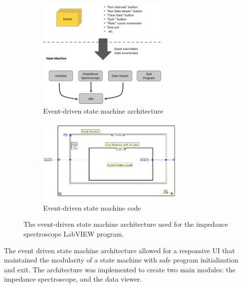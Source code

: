 \begin{figure}[H]
    \centering
    \begin{subfigure}[b]{\textwidth}
        \centering
        \includegraphics[width=0.7\textwidth]{images/program_overview.png}
        \caption{Event-driven state machine architecture}
        \label{fig:IS_architecture}
    \end{subfigure}
    \vspace{0.1 in}
    \vfill
    \begin{subfigure}[b]{\textwidth}
        \centering
        \includegraphics[width=0.8\textwidth]{images/event_driven_SM.png}
        \caption{Event-driven state machine code}
        \label{fig:IS-base_code}
    \end{subfigure}
    \caption[Event-driven state machine architecture]{The event-driven state machine architecture used for the impedance spectroscope LabVIEW program.}
    \label{fig:IS_software_design}
\end{figure}

\par The event driven state machine architecture allowed for a responsive UI that maintained the modularity of a state machine with safe program initialization and exit. The architecture was implemented to create two main modules: the impedance spectroscope, and the data viewer.

